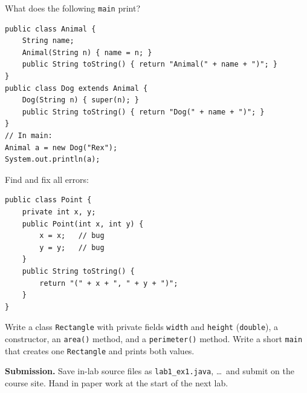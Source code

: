 \documentclass[11pt]{article}
\begin{document}
\takehomebanner

\begin{trace}
What does the following \texttt{main} print?
\begin{lstlisting}
public class Animal {
    String name;
    Animal(String n) { name = n; }
    public String toString() { return "Animal(" + name + ")"; }
}
public class Dog extends Animal {
    Dog(String n) { super(n); }
    public String toString() { return "Dog(" + name + ")"; }
}
// In main:
Animal a = new Dog("Rex");
System.out.println(a);
\end{lstlisting}
\end{trace}

\begin{bug}
Find and fix all errors:
\begin{lstlisting}
public class Point {
    private int x, y;
    public Point(int x, int y) {
        x = x;   // bug
        y = y;   // bug
    }
    public String toString() {
        return "(" + x + ", " + y + ")";
    }
}
\end{lstlisting}
\end{bug}

\begin{writecode}
Write a class \texttt{Rectangle} with private fields \texttt{width} and \texttt{height} (\texttt{double}),
a constructor, an \texttt{area()} method, and a \texttt{perimeter()} method.
Write a short \texttt{main} that creates one \texttt{Rectangle} and prints both values.
\end{writecode}

\vspace{4pt}
\noindent\textbf{Submission.} Save in-lab source files as \texttt{lab1\_ex1.java}, \ldots\ and submit on the course site.
Hand in paper work at the start of the next lab.
\end{document}
